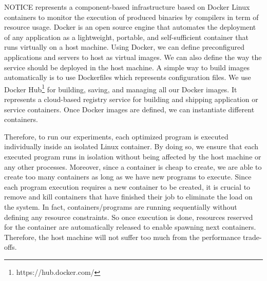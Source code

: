 NOTICE represents a component-based infrastructure based on Docker Linux containers to monitor the execution of produced binaries by compilers in term of resource usage. 
Docker is an open source engine that automates the deployment of any application as a lightweight, portable, and self-sufficient container that runs virtually on a host machine. 
Using Docker, we can define preconfigured applications and servers to host as virtual images. We can also define the way the service should be deployed in the host machine. 
A simple way to build images automatically is to use Dockerfiles which represents configuration files.
We use Docker Hub\footnote{https://hub.docker.com/} for building, saving, and managing all our Docker images. It represents a cloud-based registry service for building and shipping application or service containers.
Once Docker images are defined, we can instantiate different containers. 

Therefore, to run our experiments, each optimized program is executed individually inside an isolated Linux container. By doing so, we ensure that each executed program runs in isolation without being affected by the host machine or any other processes. Moreover, since a container is cheap to create, we are able to create too many containers as long as we have new programs to execute. 
Since each program execution requires a new container to be created, it is crucial to remove and kill containers that have finished their job to eliminate the load on the system. In fact, containers/programs are running sequentially without defining any resource constraints. So once execution is done, resources reserved for the container are automatically released to enable spawning next containers. Therefore, the host machine will not suffer too much from the performance trade-offs.

